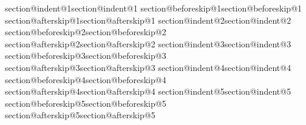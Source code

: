 \makeatletter
\expandafter\newlength\csname section@indent@1\endcsname\expandafter\setlength\csname section@indent@1\endcsname{\z@}
\expandafter\newlength\csname section@beforeskip@1\endcsname\expandafter\setlength\csname section@beforeskip@1\endcsname{-3.5ex \@plus -1ex \@minus -.2ex}
\expandafter\newlength\csname section@afterskip@1\endcsname\expandafter\setlength\csname section@afterskip@1
\expandafter\newlength\csname section@indent@2\endcsname\expandafter\setlength\csname section@indent@2\endcsname{\z@}
\expandafter\newlength\csname section@beforeskip@2\endcsname\expandafter\setlength\csname section@beforeskip@2\endcsname{-3.25ex\@plus -1ex \@minus -.2ex}
\expandafter\newlength\csname section@afterskip@2\endcsname\expandafter\setlength\csname section@afterskip@2\endcsname{1.5ex \@plus .2ex}
\expandafter\newlength\csname section@indent@3\endcsname\expandafter\setlength\csname section@indent@3\endcsname{\z@}
\expandafter\newlength\csname section@beforeskip@3\endcsname\expandafter\setlength\csname section@beforeskip@3\endcsname{-3.25ex\@plus -1ex \@minus -.2ex}
\expandafter\newlength\csname section@afterskip@3\endcsname\expandafter\setlength\csname section@afterskip@3\endcsname{1.5ex \@plus .2ex}
\expandafter\newlength\csname section@indent@4\endcsname\expandafter\setlength\csname section@indent@4\endcsname{\z@}
\expandafter\newlength\csname section@beforeskip@4\endcsname\expandafter\setlength\csname section@beforeskip@4
\expandafter\newlength\csname section@afterskip@4\endcsname\expandafter\setlength\csname section@afterskip@4\endcsname{-1em}
\expandafter\newlength\csname section@indent@5\endcsname\expandafter\setlength\csname section@indent@5\endcsname{\parindent}
\expandafter\newlength\csname section@beforeskip@5\endcsname\expandafter\setlength\csname section@beforeskip@5
\expandafter\newlength\csname section@afterskip@5\endcsname\expandafter\setlength\csname section@afterskip@5\endcsname{-1em}

